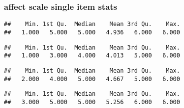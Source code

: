 \documentclass[]{article}
\newenvironment{Shaded}{\begin{snugshade}}{\end{snugshade}}
\newcommand{\KeywordTok}[1]{\textcolor[rgb]{0.13,0.29,0.53}{\textbf{#1}}}
\newcommand{\DecValTok}[1]{\textcolor[rgb]{0.00,0.00,0.81}{#1}}
\newcommand{\OperatorTok}[1]{\textcolor[rgb]{0.81,0.36,0.00}{\textbf{#1}}}
\newcommand{\NormalTok}[1]{#1}
\begin{document}
\subsubsection{affect scale single item
stats}\label{affect-scale-single-item-stats}

\begin{Shaded}
\end{Shaded}

\begin{verbatim}
##    Min. 1st Qu.  Median    Mean 3rd Qu.    Max. 
##   1.000   5.000   5.000   4.936   6.000   6.000
\end{verbatim}

\begin{Shaded}
\end{Shaded}

\begin{verbatim}
##    Min. 1st Qu.  Median    Mean 3rd Qu.    Max. 
##   1.000   3.000   4.000   4.013   5.000   6.000
\end{verbatim}

\begin{Shaded}
\end{Shaded}

\begin{verbatim}
##    Min. 1st Qu.  Median    Mean 3rd Qu.    Max. 
##   2.000   4.000   5.000   4.667   5.000   6.000
\end{verbatim}

\begin{Shaded}
\end{Shaded}

\begin{verbatim}
##    Min. 1st Qu.  Median    Mean 3rd Qu.    Max. 
##   3.000   5.000   5.000   5.256   6.000   6.000
\end{verbatim}
\end{document}

